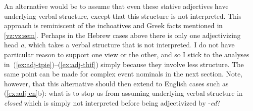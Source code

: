 An alternative would be to assume that even these stative adjectives have underlying verbal structure, except that this structure is not interpreted. This approach is reminiscent of the inchoatives and Greek facts mentioned in \ref{vz:vz:sem}. Perhaps in the Hebrew cases above there is only one adjectivizing head \emph{a}, which takes a verbal structure that is not interpreted. I do not have particular reason to support one view or the other, and so I stick to the analyses in~(\ref{ex:adj-tpie})--(\ref{ex:adj-thif}) simply because they involve less structure. The same point can be made for complex event nominals in the next section. Note, however, that this alternative should then extend to English cases such as (\ref{ex:adj-en}b): what is to stop us from assuming underlying verbal structure in \emph{closed} which is simply not interpreted before being adjectivized by -\emph{ed}?


